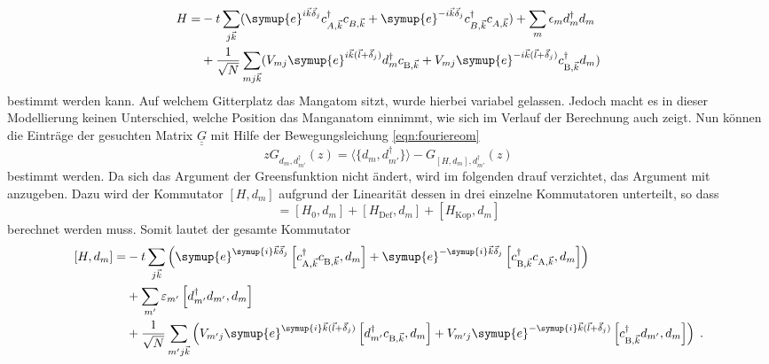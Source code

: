 \begin{equation*}
    \begin{split}
        H = &-t \sum_{j \vec{k}} ( \symup{e}^{i\vec{k}\vec{\delta}_j}c^\dagger_{A,\vec{k}} c_{B,\vec{k}} + 
            \symup{e}^{-i\vec{k}\vec{\delta}_j} c^\dagger_{B,\vec{k}}c_{A,\vec{k}}) + \sum_m \epsilon_m d_m^\dagger d_m \\
            &+ \frac{1}{\sqrt{N}}\sum_{mj\vec{k}} ( V_{mj}  \symup{e}^{i\vec{k}(\vec{l}+\vec{\delta}_j)} d_m^\dagger c_{\text{B},\vec{k}} 
            + V_{mj} \symup{e}^{-i\vec{k}(\vec{l}+\vec{\delta}_j)}c^\dagger_{\text{B},\vec{k}} d_m )
    \end{split}
\end{equation*}
bestimmt werden kann.
Auf welchem Gitterplatz das Mangatom sitzt, wurde hierbei variabel gelassen.
Jedoch macht es in dieser Modellierung keinen Unterschied, welche Position das Manganatom einnimmt, wie sich im Verlauf der Berechnung auch zeigt.
Nun können die Einträge der gesuchten Matrix $\underline{\underline{G}}$ mit Hilfe der Bewegungsleichung \eqref{eqn:fouriereom} 
\begin{equation}
    zG_{d_m, d_{m'}^\dagger}(z) = \langle \{ d_m, d_{m'}^\dagger \} \rangle - G_{[H,d_m], d_{m'}^\dagger} (z) \label{eqn:eomgreenansatz}
\end{equation}
bestimmt werden.
Da sich das Argument der Greensfunktion nicht ändert, wird im folgenden drauf verzichtet, das Argument mit anzugeben.
Dazu wird der Kommutator $[H,d_m]$ aufgrund der Linearität dessen in drei einzelne Kommutatoren unterteilt, so dass
\begin{equation*}
    [H,d_m] = [H_0,d_m] + [H_\text{Def},d_m] +[H_\text{Kop},d_m] 
\end{equation*}
berechnet werden muss.
Somit lautet der gesamte Kommutator
\begin{equation}
    \begin{split}
    [H, d_m] = &-t \sum_{j\vec{k}} \left ( \symup{e}^{\symup{i}\vec{k} \vec{\delta}_j}      \left [ c^\dagger_{\text{A},\vec{k}}  
        c_{\text{B},\vec{k}}, d_m \right ] + \symup{e}^{-\symup{i}\vec{k} \vec{\delta}_j}   \left [ c^\dagger_{\text{B},\vec{k}}  
        c_{\text{A},\vec{k}}, d_m \right ]  \right ) \\
        &+\sum_{m'} \varepsilon_{m'} \left [ d^\dagger_{m'} d_{m'}, d_{m} \right ] \\
        &+ \frac{1}{\sqrt{N}} \sum_{m'j\vec{k}} \left ( V_{m'j} \symup{e}^{\symup{i}\vec{k} (\vec{l} + \vec{\delta}_j)}   
        \left [d^\dagger_{m'}c_{\text{B}, \vec{k}}, d_m \right ]
        +  V_{m'j} \symup{e}^{-\symup{i}\vec{k} (\vec{l} + \vec{\delta}_j)}   
        \left [c^\dagger_{\text{B},\vec{k}} d_{m'},  d_m \right ]
        \right ) \; . \label{eqn:commutator_H_dm}
    \end{split}
\end{equation} 
